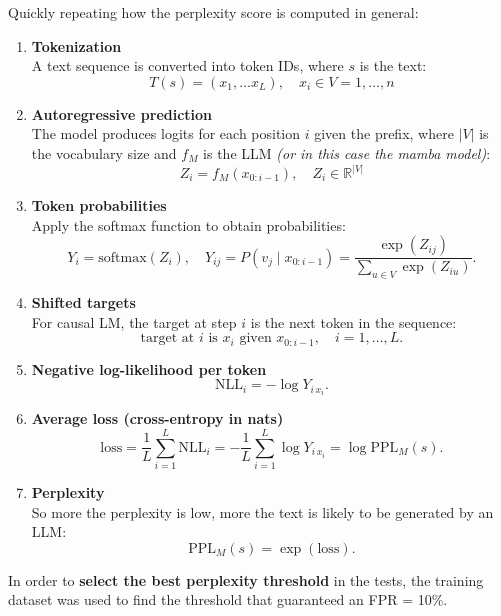 Quickly repeating how the perplexity score is computed in general:
\begin{enumerate}
    \item \textbf{Tokenization} \\
    A text sequence is converted into token IDs, where $s$ is the text:
    \[
        T(s) = (x_1, \dots x_L), \quad  x_i \in V = {1, \dots, n}
    \]

    \item \textbf{Autoregressive prediction} \\
    The model produces logits for each position $i$ given the prefix, 
    where $|V|$ is the vocabulary size and $f_M$ is the 
    LLM \textit{(or in this case the mamba model)}:
    \[
        Z_i = f_M(x_{0:i-1}), \quad Z_i \in \mathbb{R}^{|V|}
    \]

    \item \textbf{Token probabilities} \\
    Apply the softmax function to obtain probabilities:
    \[
        Y_i=\mathrm{softmax}(Z_i), \quad
        Y_{ij}=P(v_j \mid x_{0:i-1})=\frac{\exp(Z_{ij})}{\sum_{u\in V}\exp(Z_{iu})}.
    \]

    \item \textbf{Shifted targets} \\
    For causal LM, the target at step $i$ is the next token in the sequence:
    \[
        \text{target at } i \text{ is } x_i \text{ given } x_{0:i-1}, \quad i=1,\dots,L.
    \]

    \item \textbf{Negative log-likelihood per token} \\
    \[
        \mathrm{NLL}_i = -\log Y_{i\,x_i}.
    \]

    \item \textbf{Average loss (cross-entropy in nats)} \\
    \[
        \mathrm{loss}=\frac{1}{L}\sum_{i=1}^{L}\mathrm{NLL}_i
        =-\frac{1}{L}\sum_{i=1}^{L}\log Y_{i\,x_i}
        =\log\mathrm{PPL}_M(s).
    \]

    \item \textbf{Perplexity} \\
    So more the perplexity is low, more the text is likely to be generated by an LLM:
    \[
        \mathrm{PPL}_M(s)=\exp(\mathrm{loss}).
    \]
\end{enumerate}

In order to \textbf{select the best perplexity threshold} in the tests, 
the training dataset was used to find the threshold that guaranteed an FPR = 10\%.



